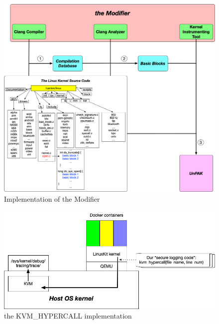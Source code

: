 \begin{figure}
\centering
\includegraphics[width=1.5\columnwidth]{diagram/linuxkit-kernel-modifier.png}
\caption{\small Implementation of the Modifier}
\label{fig:linuxkit-kernel-modifier}
\end{figure}

\begin{figure}
\centering
\includegraphics[width=1.5\columnwidth]{diagram/kvm_hypercall.png}
\caption{\small the KVM\_HYPERCALL implementation}
\label{fig:kvm_hypercall}
\end{figure}

